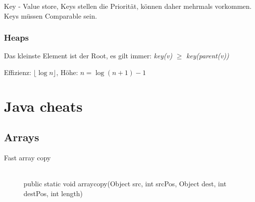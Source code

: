 Key - Value store, Keys stellen die Priorität, können daher mehrmals vorkommen. Keys müssen Comparable sein.


\subsubsection{Heaps}

Das kleinste Element ist der Root, es gilt immer: \textit{key(v) $\geq$ key(parent(v))}

Effizienz: $\lfloor \log n \rfloor$, Höhe: $n = \log(n+1) - 1$

\section{Java cheats}
\subsection{Arrays}
\begin{description}
	
	\item[Fast array copy] \hfill \\
		public static void arraycopy(Object src, int srcPos, Object dest, int destPos, int length)

\end{description}
